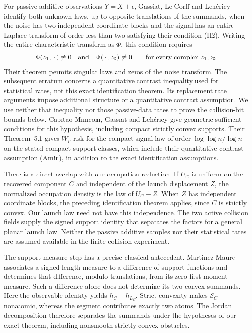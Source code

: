 For passive additive observations $Y=X+\epsilon$, Gassiat, Le Corff
and Leh\'ericy \cite[Theorem~2.1]{GLL} identify both unknown laws,
up to opposite translations of the summands, when the noise has two
independent coordinate blocks and the signal has an entire Laplace
transform of order less than two satisfying their condition (H2).
Writing the entire characteristic transform as $\Phi$, this condition
requires
\[
 \Phi(z_1,\,\cdot\,)\not\equiv0
 \quad\hbox{and}\quad
 \Phi(\,\cdot\,,z_2)\not\equiv0
 \qquad\hbox{for every complex }z_1,z_2.
\]
Their theorem permits singular laws and zeros of the noise transform.
The subsequent erratum \cite{GLLErratum} concerns a quantitative
contrast inequality used for statistical rates, not this exact
identification theorem. Its replacement rate arguments impose
additional structure or a quantitative contrast assumption. We use
neither that inequality nor those passive-data rates to prove the
collision-bit bounds below.
Capitao-Miniconi, Gassiat and Leh\'ericy
\cite[Corollary~2.5]{CGLSupport} give geometric sufficient conditions
for this hypothesis, including compact strictly convex supports.
Their Theorem~5.1 gives $W_p$ risk for the compact signal law of order
$\log\log n/\log n$ on the stated compact-support classes, which
include their quantitative contrast assumption (Amin), in addition
to the exact identification assumptions.

There is a direct overlap with our occupation reduction. If $U_C$ is
uniform on the recovered component $C$ and independent of the launch
displacement $Z$, the normalized occupation density is the law of
$U_C-Z$. When $Z$ has independent coordinate blocks, the preceding
identification theorem applies, since $C$ is strictly convex. Our
launch law need not have this independence. The two active collision
fields supply the signed support identity that separates the factors
for a general planar launch law. Neither the passive additive samples
nor their statistical rates are assumed available in the finite
collision experiment.

The support-measure step has a precise classical antecedent.
Martinez-Maure \cite[Definition~4.4 and Theorem~4.6]{MartinezMaure}
associates a signed length measure to a difference of support
functions and determines that difference, modulo translations, from
its zero-first-moment measure. Such a difference alone does not
determine its two convex summands. Here the observable identity yields
$h_C-h_{L_C}$. Strict convexity makes $S_C$ nonatomic, whereas the
segment contributes exactly two atoms. The Jordan decomposition
therefore separates the summands under the hypotheses of our exact
theorem, including nonsmooth strictly convex obstacles.

